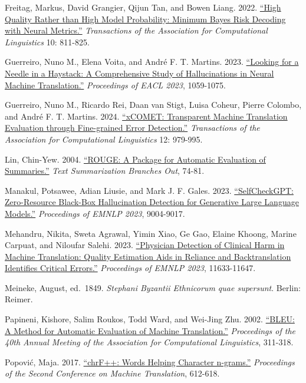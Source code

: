 \documentclass[
  12pt,
]{article}
\begin{document}
Freitag, Markus, David Grangier, Qijun Tan, and Bowen Liang. 2022.
\href{https://doi.org/10.1162/tacl_a_00491}{``High Quality Rather than
High Model Probability: Minimum Bayes Risk Decoding with Neural
Metrics.''} \emph{Transactions of the Association for Computational
Linguistics} 10: 811-825.

Guerreiro, Nuno M., Elena Voita, and André F. T. Martins. 2023.
\href{https://aclanthology.org/2023.eacl-main.75/}{``Looking for a
Needle in a Haystack: A Comprehensive Study of Hallucinations in Neural
Machine Translation.''} \emph{Proceedings of EACL 2023}, 1059-1075.

Guerreiro, Nuno M., Ricardo Rei, Daan van Stigt, Luisa Coheur, Pierre
Colombo, and André F. T. Martins. 2024.
\href{https://aclanthology.org/2024.tacl-1.54/}{``xCOMET: Transparent
Machine Translation Evaluation through Fine-grained Error Detection.''}
\emph{Transactions of the Association for Computational Linguistics} 12:
979-995.

Lin, Chin-Yew. 2004. \href{https://aclanthology.org/W04-1013/}{``ROUGE:
A Package for Automatic Evaluation of Summaries.''} \emph{Text
Summarization Branches Out}, 74-81.

Manakul, Potsawee, Adian Liusie, and Mark J. F. Gales. 2023.
\href{https://doi.org/10.18653/v1/2023.emnlp-main.557}{``SelfCheckGPT:
Zero-Resource Black-Box Hallucination Detection for Generative Large
Language Models.''} \emph{Proceedings of EMNLP 2023}, 9004-9017.

Mehandru, Nikita, Sweta Agrawal, Yimin Xiao, Ge Gao, Elaine Khoong,
Marine Carpuat, and Niloufar Salehi. 2023.
\href{https://doi.org/10.18653/v1/2023.emnlp-main.712}{``Physician
Detection of Clinical Harm in Machine Translation: Quality Estimation
Aids in Reliance and Backtranslation Identifies Critical Errors.''}
\emph{Proceedings of EMNLP 2023}, 11633-11647.

Meineke, August, ed.~1849. \emph{Stephani Byzantii Ethnicorum quae
supersunt}. Berlin: Reimer.

Papineni, Kishore, Salim Roukos, Todd Ward, and Wei-Jing Zhu. 2002.
\href{https://aclanthology.org/P02-1040/}{``BLEU: A Method for Automatic
Evaluation of Machine Translation.''} \emph{Proceedings of the 40th
Annual Meeting of the Association for Computational Linguistics},
311-318.

Popović, Maja. 2017. \href{https://aclanthology.org/W17-4770/}{``chrF++:
Words Helping Character n-grams.''} \emph{Proceedings of the Second
Conference on Machine Translation}, 612-618.
\end{document}
